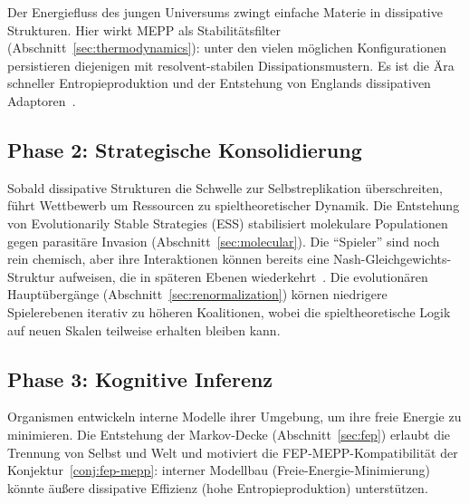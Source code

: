 \documentclass[12pt,a4paper]{article}
\theoremstyle{remark}
\begin{document}
Der Energiefluss des jungen Universums zwingt einfache Materie in dissipative Strukturen. Hier wirkt MEPP als Stabilitätsfilter (Abschnitt~\ref{sec:thermodynamics}): unter den vielen möglichen Konfigurationen persistieren diejenigen mit resolvent-stabilen Dissipationsmustern. Es ist die Ära schneller Entropieproduktion und der Entstehung von Englands dissipativen Adaptoren~\citep{EcosystemMEPP}.

\subsection{Phase 2: Strategische Konsolidierung}

Sobald dissipative Strukturen die Schwelle zur Selbstreplikation überschreiten, führt Wettbewerb um Ressourcen zu spieltheoretischer Dynamik. Die Entstehung von Evolutionarily Stable Strategies (ESS) stabilisiert molekulare Populationen gegen parasitäre Invasion (Abschnitt~\ref{sec:molecular}). Die ``Spieler'' sind noch rein chemisch, aber ihre Interaktionen können bereits eine Nash-Gleichgewichts-Struktur aufweisen, die in späteren Ebenen wiederkehrt~\citep{MaynardSmithPrice1973}. Die evolutionären Hauptübergänge (Abschnitt~\ref{sec:renormalization}) körnen niedrigere Spielerebenen iterativ zu höheren Koalitionen, wobei die spieltheoretische Logik auf neuen Skalen teilweise erhalten bleiben kann.

\subsection{Phase 3: Kognitive Inferenz}

Organismen entwickeln interne Modelle ihrer Umgebung, um ihre freie Energie zu minimieren. Die Entstehung der Markov-Decke (Abschnitt~\ref{sec:fep}) erlaubt die Trennung von Selbst und Welt und motiviert die FEP-MEPP-Kompatibilität der Konjektur~\ref{conj:fep-mepp}: interner Modellbau (Freie-Energie-Minimierung) könnte äußere dissipative Effizienz (hohe Entropieproduktion) unterstützen.
\end{document}
